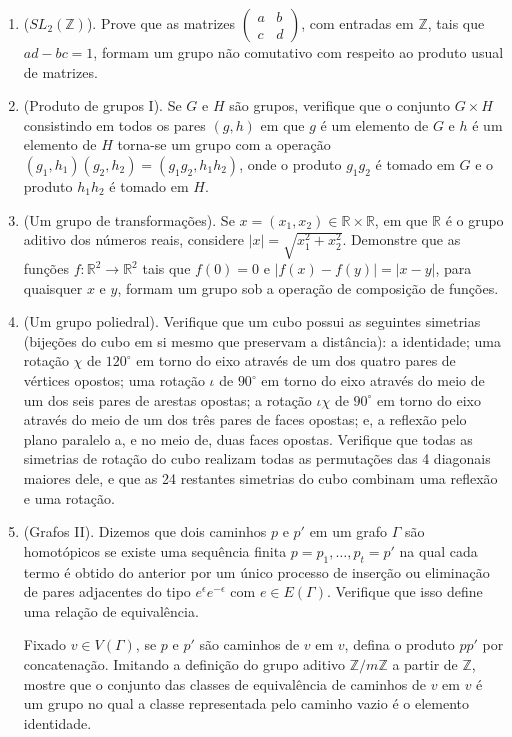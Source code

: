 \begin{enumerate}[label=8.\arabic*.]
    \item (\textbf{$SL_2(\mathbb{Z})$}). Prove que as matrizes 
    \(
    \begin{pmatrix}a & b \\ c & d \end{pmatrix}
    \), com entradas em $\mathbb{Z}$, tais que $ad - bc = 1$, formam um grupo não comutativo com respeito ao produto usual de matrizes. 

    \item (Produto de grupos I). Se $G$ e $H$ são grupos, verifique que o conjunto 
    $G \times H$ consistindo em todos os pares $(g,h)$ em que $g$ é um elemento de $G$ e $h$ é um elemento de $H$ 
    torna-se um grupo com a operação $(g_1,h_1)(g_2,h_2) = (g_1g_2, h_1h_2)$,
    onde o produto $g_1g_2$ é tomado em $G$ e o produto $h_1h_2$ é tomado em $H$.

    \item (Um grupo de transformações). Se $x = (x_1, x_2) \in \mathbb{R} \times \mathbb{R}$, em que $\mathbb{R}$ 
    é o grupo aditivo dos números reais, considere $|x| = \sqrt{x_1^2 + x_2^2}$. Demonstre que as 
    funções $f : \mathbb{R}^2 \to \mathbb{R}^2$ tais que $f(0) = 0$ e $|f(x) - f(y)| = |x - y|$, para quaisquer 
    $x$ e $y$, formam um grupo sob a operação de composição de funções. 

    \item (Um grupo poliedral). Verifique que um cubo possui as seguintes simetrias (bijeções do cubo em 
    si mesmo que preservam a distância): a identidade; uma rotação $\chi$ de $120^\circ$ em torno do eixo 
    através de um dos quatro pares de vértices opostos; uma rotação $\iota$ de $90^\circ$ em torno do eixo 
    através do meio de um dos seis pares de arestas opostas; a rotação $\iota\chi$ de $90^\circ$ em torno 
    do eixo através do meio de um dos três pares de faces opostas; e, a reflexão pelo plano paralelo a, e 
    no meio de, duas faces opostas. 
    Verifique que todas as simetrias de rotação do cubo realizam todas as permutações das 4 diagonais maiores 
    dele, e que as 24 restantes simetrias do cubo combinam uma reflexão e uma rotação. 

    \item (Grafos II). Dizemos que dois caminhos $p$ e $p'$ em um grafo $\Gamma$ são homotópicos se existe uma 
    sequência finita $p = p_1, \ldots, p_t = p'$ na qual cada termo é obtido do anterior por um único processo 
    de inserção ou eliminação de pares adjacentes do tipo $e^{\epsilon}e^{-\epsilon}$ com $e \in E(\Gamma)$. 
    Verifique que isso define uma relação de equivalência. 

    Fixado $v \in V(\Gamma)$, se $p$ e $p'$ são caminhos de $v$ em $v$, defina o produto $pp'$ por concatenação. 
    Imitando a definição do grupo aditivo $\mathbb{Z}/m\mathbb{Z}$ a partir de $\mathbb{Z}$, mostre que o conjunto 
    das classes de equivalência de caminhos de $v$ em $v$ é um grupo no qual a classe representada pelo caminho vazio 
    é o elemento identidade. 

\end{enumerate}
